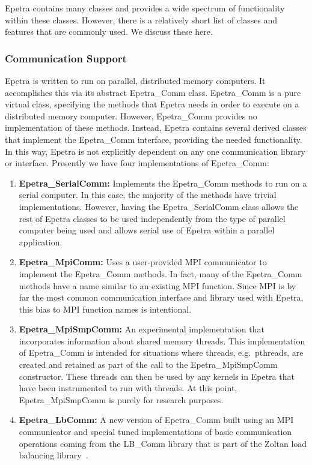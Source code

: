 \documentclass[12pt,relax]{EpetraUserGuide}
\newcommand{\comm}{Epetra\_Comm}
\newcommand{\serialcomm}{Epetra\_SerialComm}
\newcommand{\mpicomm}{Epetra\_MpiComm}
\newcommand{\mpismpcomm}{Epetra\_MpiSmpComm}
\newcommand{\lbcomm}{Epetra\_LbComm}
\begin{document}
Epetra contains many classes and provides a wide spectrum of
functionality within these classes.  However, there is a relatively
short list of classes and features that are commonly used.  We discuss
these here.

\subsubsection{Communication Support}
Epetra is written to run on parallel, distributed memory computers.  It accomplishes 
this via its abstract \comm{} class.  \comm{} is a pure virtual class,
specifying the methods that Epetra needs in order to execute on a
distributed memory computer.  However, \comm{} provides no
implementation of these methods.  Instead, Epetra contains
several derived classes that implement the \comm{} interface,
providing the needed functionality.  In this way, Epetra is not
explicitly dependent on any one communication library or interface.
Presently we have four implementations of \comm{}:
\begin{enumerate}
\item {\bf \serialcomm{}: } Implements the \comm{}
methods to run on a serial computer.  In this case, the majority of
the methods have trivial implementations.  However, having the
\serialcomm{} class allows the rest of Epetra classes to be used
independently from the type of parallel computer being used and allows
serial use of Epetra within a parallel application.
\item {\bf \mpicomm{}: } Uses a user-provided MPI
communicator to implement the \comm{} methods.  In fact, many of the
\comm{} methods have a name similar to an existing MPI function.
Since MPI is by far the most common communication interface and
library used with Epetra, this bias to MPI function names is
intentional.
\item {\bf \mpismpcomm{}:} An experimental implementation that
incorporates information about shared memory threads.  This
implementation of \comm{} is intended for situations where threads,
e.g.~pthreads, are created and retained as part of the call to the 
\mpismpcomm{} constructor.  These threads can then be used by any
kernels in Epetra that have been instrumented to run with threads.  At
this point, \mpismpcomm{} is purely for research purposes.
\item {\bf \lbcomm{}: } A new version of \comm{} built using an MPI
communicator and special tuned implementations of basic communication
operations coming from the LB\_Comm library that is part of the Zoltan
load balancing library~\cite{zoltan-ug}.
\end{enumerate}
\end{document}
